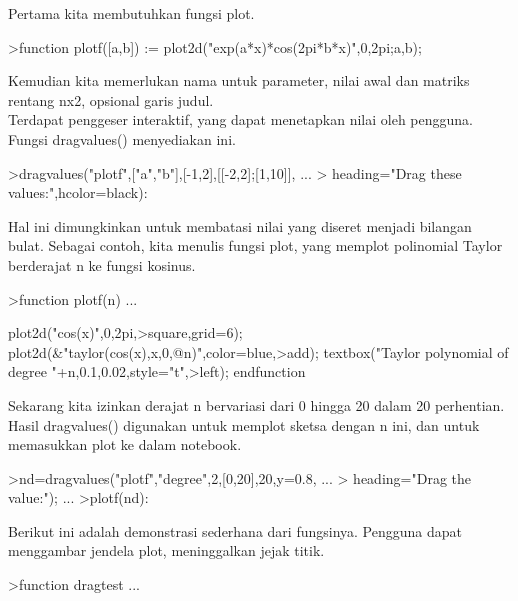 \documentclass{article}
\begin{document}
\begin{eulernotebook}
\begin{eulercomment}
\begin{eulercomment}
\begin{eulercomment}
\begin{eulercomment}
\begin{eulercomment}
Pertama kita membutuhkan fungsi plot.
\end{eulercomment}
\begin{eulerprompt}
>function plotf([a,b]) := plot2d("exp(a*x)*cos(2pi*b*x)",0,2pi;a,b);
\end{eulerprompt}
\begin{eulercomment}
Kemudian kita memerlukan nama untuk parameter, nilai awal dan matriks
rentang nx2, opsional garis judul.\\
Terdapat penggeser interaktif, yang dapat menetapkan nilai oleh
pengguna. Fungsi dragvalues() menyediakan ini.
\end{eulercomment}
\begin{eulerprompt}
>dragvalues("plotf",["a","b"],[-1,2],[[-2,2];[1,10]], ...
>  heading="Drag these values:",hcolor=black):
\end{eulerprompt}
\begin{eulercomment}
Hal ini dimungkinkan untuk membatasi nilai yang diseret menjadi
bilangan bulat. Sebagai contoh, kita menulis fungsi plot, yang memplot
polinomial Taylor berderajat n ke fungsi kosinus.
\end{eulercomment}
\begin{eulerprompt}
>function plotf(n) ...
\end{eulerprompt}
\begin{eulerudf}
  plot2d("cos(x)",0,2pi,>square,grid=6);
  plot2d(&"taylor(cos(x),x,0,@n)",color=blue,>add);
  textbox("Taylor polynomial of degree "+n,0.1,0.02,style="t",>left);
  endfunction
\end{eulerudf}
\begin{eulercomment}
Sekarang kita izinkan derajat n bervariasi dari 0 hingga 20 dalam 20
perhentian. Hasil dragvalues() digunakan untuk memplot sketsa dengan n
ini, dan untuk memasukkan plot ke dalam notebook.
\end{eulercomment}
\begin{eulerprompt}
>nd=dragvalues("plotf","degree",2,[0,20],20,y=0.8, ...
>   heading="Drag the value:"); ...
>plotf(nd):
\end{eulerprompt}
\begin{eulercomment}
Berikut ini adalah demonstrasi sederhana dari fungsinya. Pengguna
dapat menggambar jendela plot, meninggalkan jejak titik.
\end{eulercomment}
\begin{eulerprompt}
>function dragtest ...

\end{eulerprompt}
\end{eulercomment}
\end{eulercomment}
\end{eulercomment}
\end{eulercomment}
\end{eulernotebook}
\end{document}

